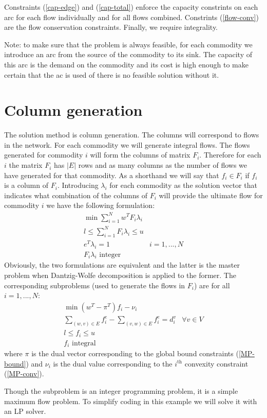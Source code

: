 \documentclass{article}
\begin{document}
Constraints (\ref{cap-edge}) and (\ref{cap-total}) enforce the capacity
constrints on each arc for each flow individually and for all flows combined.
Constrints (\ref{flow-conv}) are the flow conservation constraints. Finally,
we require integrality.

Note: to make sure that the problem is always feasible, for each commodity we
introduce an arc from the source of the commodity to its sink. The capacity of
this arc is the demand on the commodity and its cost is high enough to make
certain that the ac is used of there is no feasible solution without it.

\section{Column generation}
The solution method is column generation. The columns will correspond to flows
in the network. For each commodity we will generate integral flows. The flows
generated for commodity $i$ will form the columns of matrix $F_i$. Therefore
for each $i$ the matrix $F_i$ has $|E|$ rows and as many columns as the number
of flows we have generated for that commodity. As a shorthand we will say that
$f_i \in F_i$ if $f_i$ is a column of $F_i$. Introducing $\lambda_i$ for each
commodity as the solution vector that indicates what combination of the
columns of $F_i$ will provide the ultimate flow for commodity $i$ we have the
following formulation:
\begin{eqnarray}[r:l]
\min\sum_{i=1}^Nw^TF_i\lambda_i
& \nonumber \\
l \le\sum_{i=1}^NF_i\lambda_i\le u 
& \label{MP-bound} \\
e^T\lambda_i = 1 & 
i=1,...,N \label{MP-conv}\\
F_i\lambda_i \textrm{\ integer} 
& 
\end{eqnarray}
Obviously, the two formulations are equivalent and the latter is the master
problem when Dantzig-Wolfe decomposition is applied to the former. The
corresponding subproblems (used to generate the flows in $F_i$) are for all
$i=1,...,N$:
\begin{eqnarray}[l:r]
\min(w^T-\pi^T)f_i-\nu_i & \nonumber \\
\sum_{(w,v)\in E}f^e_i - \sum_{(v,w)\in E}f^e_i = d^v_i 
& \forall v\in V \label{MP-flow-conv}\\
l \le f_i \le u & \\
f_i \textrm{\ integral} &
\end{eqnarray}
where $\pi$ is the dual vector corresponding to the global bound constraints
(\ref{MP-bound}) and $\nu_i$ is the dual value corresponding to the
$i^\textrm{th}$ convexity constraint (\ref{MP-conv}).

Though the subproblem is an integer programming problem, it is a simple
maximum flow problem. To simplify coding in this example we will solve it with
an LP solver.
\end{document}
